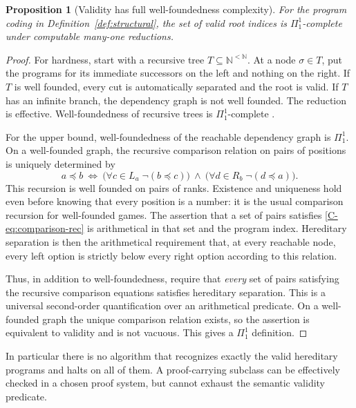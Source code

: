 \documentclass[11pt,letterpaper]{article}
\numberwithin{equation}{section}
\newtheorem{proposition}[theorem]{Proposition}
\theoremstyle{definition}
\theoremstyle{remark}
\newcommand{\N}{\mathbb N}
\begin{document}
\begin{proposition}[Validity has full well-foundedness complexity]
\label{prop:validity}
For the program coding in Definition~\ref{def:structural}, the set of valid
root indices is $\Pi^1_1$-complete under computable many-one reductions.
\end{proposition}
\begin{proof}
For hardness, start with a recursive tree $T\subseteq\N^{<\N}$. At a node
$\sigma\in T$, put the programs for its immediate successors on the left
and nothing on the right. If $T$ is well founded, every cut is automatically
separated and the root is valid. If $T$ has an infinite branch, the dependency
graph is not well founded. The reduction is effective. Well-foundedness of
recursive trees is $\Pi^1_1$-complete \cite{sacks}.

For the upper bound, well-foundedness of the reachable dependency graph is
$\Pi^1_1$. On a well-founded graph, the recursive comparison relation on
pairs of positions is uniquely determined by
\begin{equation}
 a\preccurlyeq b\ \Longleftrightarrow\
 \bigl(\forall c\in L_a\;\neg(b\preccurlyeq c)\bigr)
 \ \land\
 \bigl(\forall d\in R_b\;\neg(d\preccurlyeq a)\bigr).
 \label{C-eq:comparison-rec}
\end{equation}
This recursion is well founded on pairs of ranks. Existence and uniqueness
hold even before knowing that every position is a number: it is the usual
comparison recursion for well-founded games. The assertion that a set of
pairs satisfies \eqref{C-eq:comparison-rec} is arithmetical in that set and the
program index. Hereditary separation is then the arithmetical requirement
that, at every reachable node, every left option is strictly below every
right option according to this relation.

Thus, in addition to well-foundedness, require that \emph{every} set of pairs
satisfying the recursive comparison equations satisfies hereditary
separation. This is a universal second-order quantification over an
arithmetical predicate. On a well-founded graph the unique comparison
relation exists, so the assertion is equivalent to validity and is not
vacuous. This gives a $\Pi^1_1$ definition.
\end{proof}

In particular there is no algorithm that recognizes exactly the valid
hereditary programs and halts on all of them. A proof-carrying subclass can
be effectively checked in a chosen proof system, but cannot exhaust the
semantic validity predicate.
\end{document}
